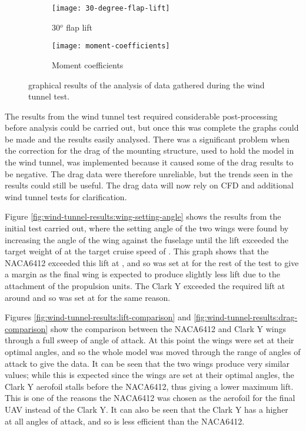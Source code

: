 \documentclass[../../main.tex]{subfiles}
\begin{document}
\begin{figure}[H]
    \begin{subfigure}[b]{0.49\columnwidth}
        \centering
        \texttt{[image: 30-degree-flap-lift]}
        \caption{30$^o$ flap lift}
        \label{fig:wind-tunnel-results:30-degree-flap-lift}
    \end{subfigure}
    \hfill
    \begin{subfigure}[b]{0.49\columnwidth}
        \centering
        \texttt{[image: moment-coefficients]}
        \caption{Moment coefficients}
        \label{fig:wind-tunnel-results:moment-coefficients}
    \end{subfigure}

    \caption{graphical results of the analysis of data gathered during the wind tunnel test.}
    \label{fig:wind-tunnel-results}
\end{figure}

The results from the wind tunnel test required considerable post-processing before analysis could be carried out, but once this was complete the graphs could be made and the results easily analysed.
There was a significant problem when the correction for the drag of the mounting structure, used to hold the model in the wind tunnel, was implemented because it caused some of the drag results to be negative.
The drag data were therefore unreliable, but the trends seen in the results could still be useful.
The drag data will now rely on CFD and additional wind tunnel tests for clarification.

Figure \ref{fig:wind-tunnel-results:wing-setting-angle} shows the results from the initial test carried out, where the setting angle of the two wings were found by increasing the angle of the wing against the fuselage until the lift exceeded the target weight of  at the target cruise speed of .
This graph shows that the NACA6412 exceeded this lift at , and so was set at  for the rest of the test to give a margin as the final wing is expected to produce slightly less lift due to the attachment of the propulsion units.
The Clark Y exceeded the required lift at around  and so was set at  for the same reason. 

Figures \ref{fig:wind-tunnel-results:lift-comparison} and \ref{fig:wind-tunnel-results:drag-comparison} show the comparison between the NACA6412 and Clark Y wings through a full sweep of angle of attack.
At this point the wings were set at their optimal angles, and so the whole model was moved through the range of angles of attack to give the data.
It can be seen that the two wings produce very similar \cl\, values; while this is expected since the wings are set at their optimal angles, the Clark Y aerofoil stalls before the NACA6412, thus giving a lower maximum lift.
This is one of the reasons the NACA6412 was chosen as the aerofoil for the final UAV instead of the Clark Y.
It can also be seen that the Clark Y has a higher \cd\, at all angles of attack, and so is less efficient than the NACA6412.
\end{document}
